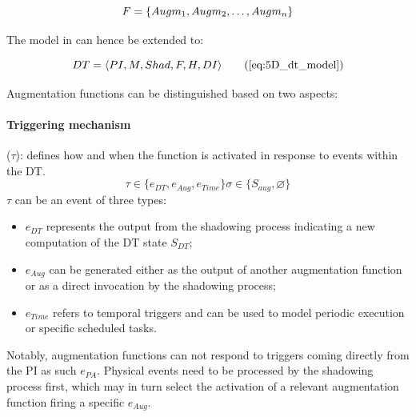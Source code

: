 \begin{equation}\label{eq:augm_set}
    F = \{Augm_{1}, Augm_{2}, \dots, Augm_{n}\}\\
\end{equation}

The model in  can hence be extended to: 

\begin{equation}
DT = \langle PI, M, Shad, F, H, DI \rangle
\tag{\ref{eq:5D_dt_model}}
\end{equation}

Augmentation functions can be distinguished based on two aspects:


\paragraph{Triggering mechanism} (\( \tau \)): defines how and when the function is activated in response to events within the \ac{DT}.
%
\begin{equation}
\tau \in \{ e_{DT}, e_{Aug}, e_{Time} \}  \sigma \in \{S_{aug}, \varnothing\}
\end{equation}
%
\(\tau\) can be an event of three types:
%
\begin{itemize}
\item \( e_{DT} \) represents the output from the shadowing process indicating a new computation of the \ac{DT} state \( S_{DT} \);
\item \( e_{Aug} \) can be generated either as the output of another augmentation function or as a direct invocation by the shadowing process;
\item \( e_{Time} \) refers to temporal triggers and can be used to model periodic execution or specific scheduled tasks.
\end{itemize}
%
Notably, augmentation functions can not respond to triggers coming directly from the \ac{PI} as such $e_{PA}$.
Physical events need to be processed by the shadowing process first, which may in turn select the activation of a relevant augmentation function firing a specific $e_{Aug}$.



